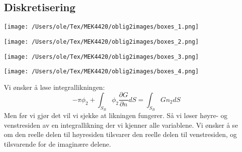 \documentclass{beamer}
\begin{document}
\subsection{Diskretisering}
\begin{frame}{}
    \begin{minipage}[t]{0.45\linewidth}
        \centering
        \texttt{[image: /Users/ole/Tex/MEK4420/oblig2images/boxes\_1.png]}
    \end{minipage}%
    \hspace{0.05\linewidth}  %
    \begin{minipage}[t]{0.45\linewidth}
        \centering
        \texttt{[image: /Users/ole/Tex/MEK4420/oblig2images/boxes\_2.png]}
    \end{minipage}

    \vspace{-0.2cm}  %

    \begin{minipage}[t]{0.45\linewidth}
        \centering
        \texttt{[image: /Users/ole/Tex/MEK4420/oblig2images/boxes\_3.png]}
    \end{minipage}%
    \hspace{0.05\linewidth}  %
    \begin{minipage}[t]{0.45\linewidth}
        \centering
        \texttt{[image: /Users/ole/Tex/MEK4420/oblig2images/boxes\_4.png]}
    \end{minipage}
\end{frame}

\begin{frame}
Vi ønsker å løse integrallikningen:
\begin{equation}\label{eq:144}
    -\pi \phi_2  + \int_{S_B} \phi_2 \frac{\partial G}{\partial n}  dS = \int_{S_B} G n_2 dS
\end{equation}
Men før vi gjør det vil vi sjekke at likningen fungerer. Så vi løser høyre- og venstresiden av en integrallikning der vi kjenner alle variablene. Vi ønsker å se om den reelle delen til høyresiden tilsvarer den reelle delen til venstresiden, og tilsvarende for de imaginære delene. 
\end{frame}

\end{document}
